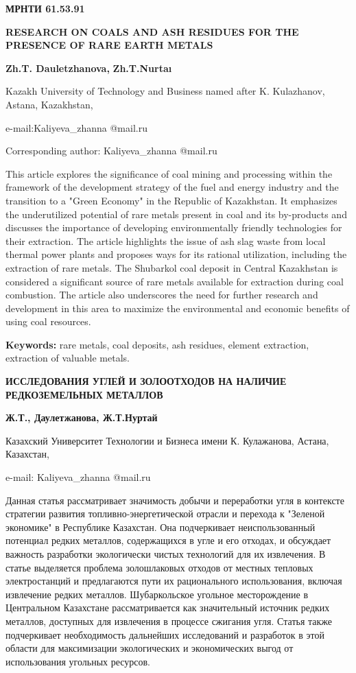 \newpage
{\bfseries МРНТИ 61.53.91}

{\bfseries RESEARCH ON COALS AND ASH RESIDUES FOR THE PRESENCE OF RARE
EARTH METALS}

{\bfseries Zh.T. Dauletzhanova,} {\bfseries Zh.T.Nurtaı}

Kazakh University of Technology and Business named after K. Kulazhanov,
Astana, Kazakhstan,

e-mail:Kaliyeva\_zhanna @mail.ru

Corresponding author: Kaliyeva\_zhanna @mail.ru

This article explores the significance of coal mining and processing
within the framework of the development strategy of the fuel and energy
industry and the transition to a "Green Economy" in the Republic of
Kazakhstan. It emphasizes the underutilized potential of rare metals
present in coal and its by-products and discusses the importance of
developing environmentally friendly technologies for their extraction.
The article highlights the issue of ash slag waste from local thermal
power plants and proposes ways for its rational utilization, including
the extraction of rare metals. The Shubarkol coal deposit in Central
Kazakhstan is considered a significant source of rare metals available
for extraction during coal combustion. The article also underscores the
need for further research and development in this area to maximize the
environmental and economic benefits of using coal resources.

{\bfseries Keywords:} rare metals, coal deposits, ash residues, element
extraction, extraction of valuable metals.

{\bfseries ИССЛЕДОВАНИЯ УГЛЕЙ И ЗОЛООТХОДОВ НА НАЛИЧИЕ РЕДКОЗЕМЕЛЬНЫХ
МЕТАЛЛОВ}

{\bfseries Ж.Т., Даулетжанова, Ж.Т.Нуртай}

Казахский Университет Технологии и Бизнеса имени К. Кулажанова, Астана,
Казахстан,

e-mail: Kaliyeva\_zhanna @mail.ru

Данная статья рассматривает значимость добычи и переработки угля в
контексте стратегии развития топливно-энергетической отрасли и перехода
к "Зеленой экономике" в Республике Казахстан. Она подчеркивает
неиспользованный потенциал редких металлов, содержащихся в угле и его
отходах, и обсуждает важность разработки экологически чистых технологий
для их извлечения. В статье выделяется проблема золошлаковых отходов от
местных тепловых электростанций и предлагаются пути их рационального
использования, включая извлечение редких металлов. Шубаркольское
угольное месторождение в Центральном Казахстане рассматривается как
значительный источник редких металлов, доступных для извлечения в
процессе сжигания угля. Статья также подчеркивает необходимость
дальнейших исследований и разработок в этой области для максимизации
экологических и экономических выгод от использования угольных ресурсов.

